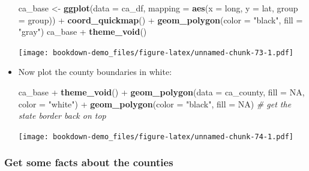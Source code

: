 \documentclass[]{book}
\newenvironment{Shaded}{\begin{snugshade}}{\end{snugshade}}
\newcommand{\KeywordTok}[1]{\textcolor[rgb]{0.13,0.29,0.53}{\textbf{{#1}}}}
\newcommand{\DataTypeTok}[1]{\textcolor[rgb]{0.13,0.29,0.53}{{#1}}}
\newcommand{\StringTok}[1]{\textcolor[rgb]{0.31,0.60,0.02}{{#1}}}
\newcommand{\CommentTok}[1]{\textcolor[rgb]{0.56,0.35,0.01}{\textit{{#1}}}}
\newcommand{\OtherTok}[1]{\textcolor[rgb]{0.56,0.35,0.01}{{#1}}}
\newcommand{\NormalTok}[1]{{#1}}
\theoremstyle{definition}
\theoremstyle{definition}
\theoremstyle{remark}
\begin{document}
\begin{itemize}
\begin{Shaded}
\begin{Highlighting}[]
\NormalTok{ca_base <-}\StringTok{ }\KeywordTok{ggplot}\NormalTok{(}\DataTypeTok{data =} \NormalTok{ca_df, }\DataTypeTok{mapping =} \KeywordTok{aes}\NormalTok{(}\DataTypeTok{x =} \NormalTok{long, }\DataTypeTok{y =} \NormalTok{lat, }\DataTypeTok{group =} \NormalTok{group)) +}\StringTok{ }
\StringTok{  }\KeywordTok{coord_quickmap}\NormalTok{() +}\StringTok{ }
\StringTok{  }\KeywordTok{geom_polygon}\NormalTok{(}\DataTypeTok{color =} \StringTok{"black"}\NormalTok{, }\DataTypeTok{fill =} \StringTok{"gray"}\NormalTok{)}
\NormalTok{ca_base +}\StringTok{ }\KeywordTok{theme_void}\NormalTok{()}
\end{Highlighting}
\end{Shaded}

  \texttt{[image: bookdown-demo\_files/figure-latex/unnamed-chunk-73-1.pdf]}
\item
  Now plot the county boundaries in white:

\begin{Shaded}
\begin{Highlighting}[]
\NormalTok{ca_base +}\StringTok{ }\KeywordTok{theme_void}\NormalTok{() +}\StringTok{ }
\StringTok{  }\KeywordTok{geom_polygon}\NormalTok{(}\DataTypeTok{data =} \NormalTok{ca_county, }\DataTypeTok{fill =} \OtherTok{NA}\NormalTok{, }\DataTypeTok{color =} \StringTok{"white"}\NormalTok{) +}
\StringTok{  }\KeywordTok{geom_polygon}\NormalTok{(}\DataTypeTok{color =} \StringTok{"black"}\NormalTok{, }\DataTypeTok{fill =} \OtherTok{NA}\NormalTok{)  }\CommentTok{# get the state border back on top}
\end{Highlighting}
\end{Shaded}

  \texttt{[image: bookdown-demo\_files/figure-latex/unnamed-chunk-74-1.pdf]}
\end{itemize}

\subsubsection{Get some facts about the
counties}\label{get-some-facts-about-the-counties}
\end{document}
